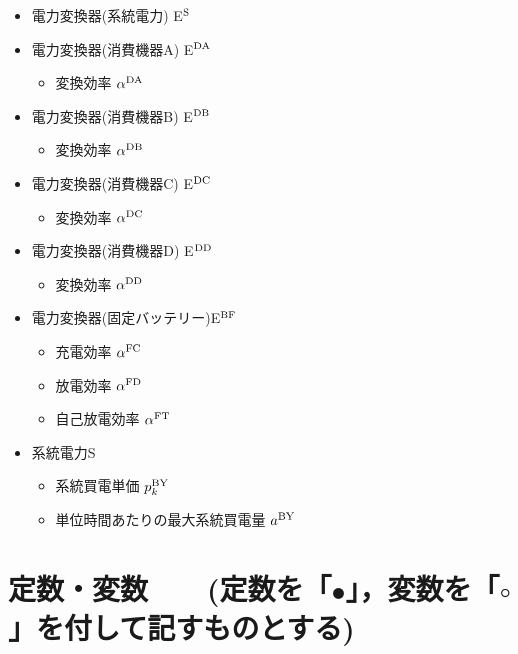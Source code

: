 \documentclass{jarticle}
\newcommand{\IB}{$\bullet$}
\newcommand{\IC}{$\circ$}
\newcommand{\IS}{$*$}
\begin{document}
\begin{itemize}
\begin{itemize}
  \end{itemize}
 \item[\IS] 電力変換器(系統電力) E$^{\rm S}$
 \item[\IS] 電力変換器(消費機器A) E$^{\rm DA}$
  \begin{itemize}
   \item[\IB] 変換効率 $\alpha^{\rm DA}$
  \end{itemize}
 \item[\IS] 電力変換器(消費機器B) E$^{\rm DB}$
  \begin{itemize}
   \item[\IB] 変換効率 $\alpha^{\rm DB}$
  \end{itemize}
 \item[\IS] 電力変換器(消費機器C) E$^{\rm DC}$
  \begin{itemize}
   \item[\IB] 変換効率 $\alpha^{\rm DC}$
  \end{itemize}
  \item[\IS] 電力変換器(消費機器D) E$^{\rm DD}$
  \begin{itemize}
   \item[\IB] 変換効率 $\alpha^{\rm DD}$
  \end{itemize} 
 \item[\IS] 電力変換器(固定バッテリー)E$^{\rm BF}$
  \begin{itemize}
   \item[\IB] 充電効率 $\alpha^{\rm FC}$
   \item[\IB] 放電効率 $\alpha^{\rm FD}$
   \item[\IB] 自己放電効率 $\alpha^{\rm FT}$
  \end{itemize}
 \item[\IS] 系統電力S
   \begin{itemize}
   \item[\IB] 系統買電単価 $p^{\rm BY}_{k}$
   \item[\IB] 単位時間あたりの最大系統買電量 $a^{\rm BY}$
  \end{itemize}
\end{itemize}

\section{定数・変数 \mbox{\normalsize\rm 
~ (定数を「\IB」，変数を「\IC」を付して記すものとする)}}
\end{document}
